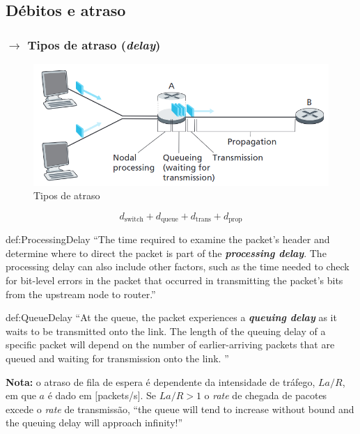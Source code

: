 \newpage
\subsection[1.3 Débitos e atraso]{\hspace*{0.075 em}\raisebox{0.2 em}{$\pmb{\drsh}$} Débitos e atraso}
\label{subsec:débitos-e-atraso}

\subsubsection[1.3.1 Tipos de Atraso]{$\pmb{\rightarrow}$ Tipos de atraso (\textit{delay})}

\begin{figure}[H]
    \centering
    \includegraphics[width = 0.7\linewidth]{img/1/delay.png}
    \caption{Tipos de atraso}
    \label{fig:delay}
\end{figure}

$$
    \boxed{d_{\text{switch}} + d_{\text{queue}} + d_{\text{trans}} + d_{\text{prop}}}
$$


\begin{theo}{def:ProcessingDelay}\label{def:ProcessingDelay}
    ``The time required to examine the packet’s header and determine where to direct the packet is part of the \textbf{\textit{processing delay}}. The processing delay can also include other factors, such as the time needed to check for bit-level errors in the packet that occurred in transmitting the packet’s bits from the upstream node to router.''\cite{Kurose2017}
\end{theo}

\begin{theo}{def:QueueDelay}\label{def:QueueDelay}
    ``At the queue, the packet experiences a \textbf{\textit{queuing delay}} as it waits to be transmitted onto the link. The length of the queuing delay of a specific packet will depend on the number of earlier-arriving packets that are queued and waiting for transmission onto the link. ''\cite{Kurose2017}

    \vspace{1 em}
    \noindent \textbf{Nota:} o atraso de fila de espera é dependente da intensidade de tráfego, $La/R$, em que $a$ é dado em $[$packets/s$]$. Se $La/R > 1$ o \textit{rate} de chegada de pacotes excede o \textit{rate} de transmissão, ``the queue will tend to increase without bound and the queuing delay will approach infinity!''\cite{Kurose2017}
\end{theo}

